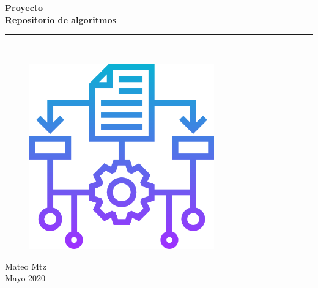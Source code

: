 \begin{titlepage}
	\begin{center}
		\huge{\textbf{Proyecto}}
		\\
		\vspace{3mm}
		{\LARGE \textbf{Repositorio de algoritmos}}
		\textcolor{azul}{\rule{\linewidth}{0.75mm}}
		\\
		\begin{figure}[h]
			\centering
			\includegraphics[width=8cm]{img/logo.png}
		\end{figure}
		\vspace{5mm}
		\textcolor{azul}{Mateo Mtz}\\
		Mayo 2020
		
	\end{center}
\end{titlepage}